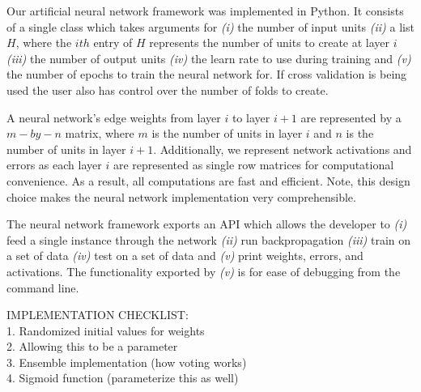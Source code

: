 Our artificial neural network framework was implemented in Python.
It consists of a single class which takes arguments for {\em (i)} the number of input units {\em (ii)} a list \(H\), where the \(ith\) entry of \(H\) represents the number of units to create at layer \(i\) {\em (iii)} the number of output units {\em (iv)} the learn rate to use during training and {\em (v)} the number of epochs to train the neural network for.
If cross validation is being used the user also has control over the number of folds to create.

A neural network's edge weights from layer \(i\) to layer \(i+1\) are represented by a \(m-by-n\) matrix, where \(m\) is the number of units in layer \(i\) and \(n\) is the number of units in layer \(i+1\).
Additionally, we represent network activations and errors as each layer \(i\) are represented as single row matrices for computational convenience.
As a result, all computations are fast and efficient.
Note, this design choice makes the neural network implementation very comprehensible.

The neural network framework exports an API which allows the developer to {\em (i)} feed a single instance through the network {\em (ii)} run backpropagation {\em (iii)} train on a set of data {\em (iv)} test on a set of data and {\em (v)} print weights, errors, and activations.
The functionality exported by {\em (v)} is for ease of debugging from the command line.

IMPLEMENTATION CHECKLIST:\\
1. Randomized initial values for weights\\
2. Allowing this to be a parameter\\
3. Ensemble implementation (how voting works)\\
4. Sigmoid function (parameterize this as well)
